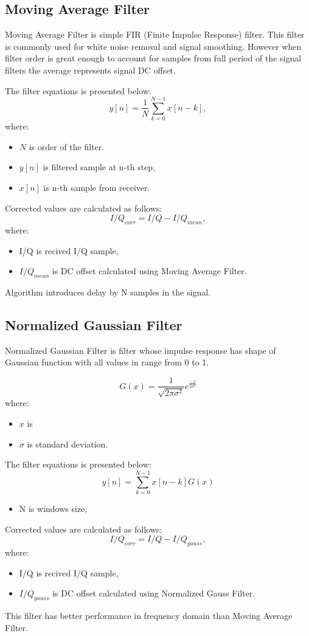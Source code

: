 \documentclass[en,printmode]{mgr}
\begin{document}
		\subsection*{Moving Average Filter}
			Moving Average Filter is simple FIR (Finite Impulse Response) filter. This filter is
			commonly used for white noise removal and signal smoothing. However when filter order
			is great enough to account for samples from full period of the signal filters the
			average represents signal DC offset.
			
			The filter equations is presented below:
			\begin{equation}
				y[n] = \frac{1}{N} \sum_{k=0}^{N-1}x[n-k], \label{eq:mva_fir}
			\end{equation}
			where:
			\begin{itemize}
				\item   $N$ is order of the filter.
				\item	$y[n]$ is filtered sample at n-th step,
				\item   $x[n]$ is n-th sample from receiver.
			\end{itemize}
			Corrected values are calculated as follows:
			\[
				I/Q_{corr} = I/Q - I/Q_{mean},
			\]
			where:
			\begin{itemize}
				\item I/Q is recived I/Q sample,
				\item $I/Q_{mean}$ is DC offset calculated using Moving Average Filter.
			\end{itemize}

			Algorithm introduces delay by N samples in the signal. 
		\subsection*{Normalized Gaussian Filter}
			Normalized Gaussian Filter is filter whose impulse response has shape of Gaussian
			function with all values in range from 0 to 1.
			
			\[
				G(x) = \frac{1}{ \sqrt{2\pi \sigma^2}}e^{\frac{-x}{2\sigma^2}}
			\]
			where:
			\begin{itemize}
				\item $x$ is 
				\item $\sigma$ is standard deviation. 
			\end{itemize}
			
			The filter equations is presented below:
			\begin{equation}
				y[n] = \sum_{k=0}^{N-1}x[n-k]G(x) \label{eq:gauss}
			\end{equation}
			\begin{itemize}
				\item N is windows size,
			\end{itemize}			
			Corrected values are calculated as follows:
			\[
				I/Q_{corr} = I/Q - I/Q_{gauss},
			\]
						where:
			\begin{itemize}
				\item I/Q is recived I/Q sample,
				\item $I/Q_{gauss}$ is DC offset calculated using Normalized Gauss Filter.
			\end{itemize}
			This filter has better performance in frequency domain than Moving Average Filter.
\end{document}
